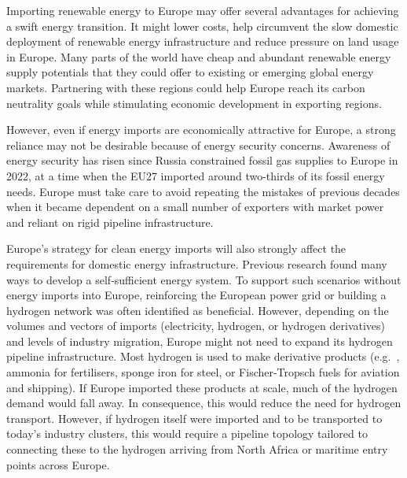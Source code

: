 
Importing renewable energy to Europe may offer several advantages for achieving
a swift energy transition. It might lower costs, help circumvent the slow
domestic deployment of renewable energy infrastructure and reduce pressure on
land usage in Europe. Many parts of the world have cheap and abundant renewable
energy supply potentials that they could offer to existing or emerging global
energy markets.\cite{irenaGlobalHydrogenTrade2022, luxSupplyCurves2021,
vanderzwaanTimmermansDream2021, fasihiLongTermHydrocarbon2017,
reichenbergDeepDecarbonization2022, galvanExportingSunshine2022,
armijoFlexibleProduction2020, pfennigGlobalGISbasedPotential2023} Partnering
with these regions could help Europe reach its carbon neutrality goals while
stimulating economic development in exporting regions.


However, even if energy imports are economically attractive for Europe, a strong
reliance may not be desirable because of energy security concerns. Awareness of
energy security has risen since Russia constrained fossil gas supplies to Europe
in 2022,\cite{pedersenLongtermImplications2022} at a time when the EU27 imported
around two-thirds of its fossil energy needs.\cite{eurostatCompleteEnergyBalances2023}
Europe must take care to avoid repeating the mistakes of previous decades when
it became dependent on a small number of exporters with market power and reliant
on rigid pipeline infrastructure.


Europe's strategy for clean energy imports will also strongly affect the
requirements for domestic energy infrastructure. Previous research found many
ways to develop a self-sufficient energy
system.\cite{pickeringDiversityOptions2022, trondleHomemadeImported2019,
brownSynergiesSector2018} To support such scenarios without energy imports into
Europe, reinforcing the European power grid or building a hydrogen network was
often identified as beneficial.\cite{neumannPotentialRoleHydrogen2023,
victoriaSpeedTechnological2022} However, depending on the volumes and vectors of
imports (electricity, hydrogen, or hydrogen derivatives) and levels of industry
migration, Europe might not need to expand its hydrogen pipeline infrastructure.
Most hydrogen is used to make derivative products (e.g.~, ammonia for
fertilisers, sponge iron for steel, or Fischer-Tropsch fuels for aviation and
shipping).\cite{neumannPotentialRoleHydrogen2023} If Europe imported these
products at scale, much of the hydrogen demand would fall away. In consequence,
this would reduce the need for hydrogen transport. However, if hydrogen itself
were imported and to be transported to today's industry clusters, this would
require a pipeline topology tailored to connecting these to the hydrogen
arriving from North Africa or maritime entry points across Europe.

